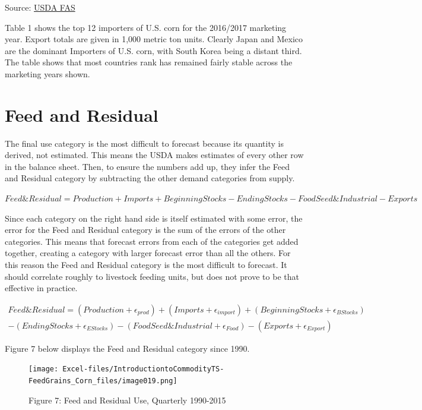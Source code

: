 \documentclass[
]{book}
\begin{document}
Source: \href{http://apps.fas.usda.gov/export-sales/myrk_rpt.htm}{USDA FAS}

Table 1 shows the top 12 importers of U.S. corn for the 2016/2017 marketing year. Export totals are given in 1,000 metric ton units. Clearly Japan and Mexico are the dominant Importers of U.S. corn, with South Korea being a distant third. The table shows that most countries rank has remained fairly stable across the marketing years shown.

\hypertarget{feed-and-residual}{%
\section{Feed and Residual}\label{feed-and-residual}}

The final use category is the most difficult to forecast because its quantity is derived, not estimated. This means the USDA makes estimates of every other row in the balance sheet. Then, to ensure the numbers add up, they infer the Feed and Residual category by subtracting the other demand categories from supply.

\(Feed\&Residual = Production + Imports + Beginning Stocks - Ending Stocks - FoodSeed\&Industrial - Exports\)

Since each category on the right hand side is itself estimated with some error, the error for the Feed and Residual category is the sum of the errors of the other categories. This means that forecast errors from each of the categories get added together, creating a category with larger forecast error than all the others. For this reason the Feed and Residual category is the most difficult to forecast. It should correlate roughly to livestock feeding units, but does not prove to be that effective in practice.

\(\begin{align} Feed\&Residual = (Production + \epsilon_{prod}) + (Imports + \epsilon_{import}) + (Beginning Stocks + \epsilon_{BStocks}) \\ - (Ending Stocks + \epsilon_{EStocks}) - (FoodSeed\&Industrial + \epsilon_{Food}) - (Exports + \epsilon_{Export}) \end{align}\)

Figure 7 below displays the Feed and Residual category since 1990.

\begin{figure}
\centering
\texttt{[image: Excel-files/IntroductiontoCommodityTS-FeedGrains\_Corn\_files/image019.png]}
\caption{Figure 7: Feed and Residual Use, Quarterly 1990-2015}
\end{figure}
\end{document}
